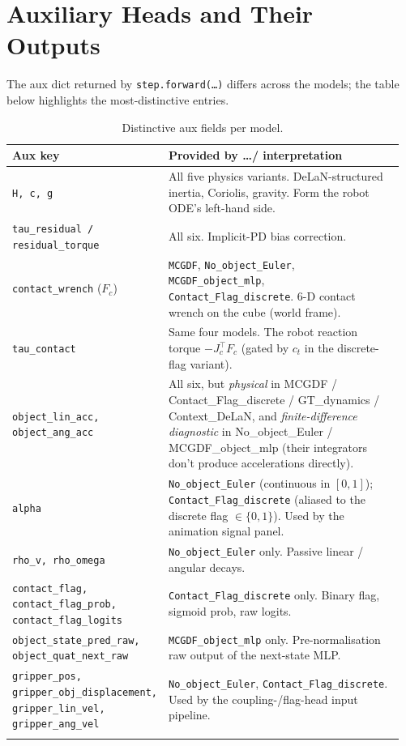 \documentclass[11pt]{article}
\begin{document}
\section{Auxiliary Heads and Their Outputs}

The aux dict returned by \texttt{step.forward(\dots)} differs across
the models; the table below highlights the most-distinctive entries.

\begin{longtable}{p{0.22\linewidth} p{0.74\linewidth}}
\toprule
Aux key & Provided by \dots / interpretation \\
\midrule
\texttt{H, c, g}                       & All five physics variants.  DeLaN-structured inertia, Coriolis, gravity.  Form the robot ODE's left-hand side. \\
\texttt{tau\_residual / residual\_torque} & All six.  Implicit-PD bias correction. \\
\texttt{contact\_wrench} ($F_c$)       & \texttt{MCGDF}, \texttt{No\_object\_Euler}, \texttt{MCGDF\_object\_mlp}, \texttt{Contact\_Flag\_discrete}.  6-D contact wrench on the cube (world frame). \\
\texttt{tau\_contact}                  & Same four models.  The robot reaction torque $-J_c^\top F_c$ (gated by $c_t$ in the discrete-flag variant). \\
\texttt{object\_lin\_acc, object\_ang\_acc} & All six, but \emph{physical} in MCGDF / Contact\_Flag\_discrete / GT\_dynamics / Context\_DeLaN, and \emph{finite-difference diagnostic} in No\_object\_Euler / MCGDF\_object\_mlp (their integrators don't produce accelerations directly). \\
\texttt{alpha}                          & \texttt{No\_object\_Euler} (continuous in $[0,1]$); \texttt{Contact\_Flag\_discrete} (aliased to the discrete flag $\in \{0,1\}$).  Used by the animation signal panel. \\
\texttt{rho\_v, rho\_omega}             & \texttt{No\_object\_Euler} only.  Passive linear / angular decays. \\
\texttt{contact\_flag, contact\_flag\_prob, contact\_flag\_logits} & \texttt{Contact\_Flag\_discrete} only.  Binary flag, sigmoid prob, raw logits. \\
\texttt{object\_state\_pred\_raw, object\_quat\_next\_raw} & \texttt{MCGDF\_object\_mlp} only.  Pre-normalisation raw output of the next-state MLP. \\
\texttt{gripper\_pos, gripper\_obj\_displacement, gripper\_lin\_vel, gripper\_ang\_vel} & \texttt{No\_object\_Euler}, \texttt{Contact\_Flag\_discrete}.  Used by the coupling-/flag-head input pipeline. \\
\bottomrule
\caption{Distinctive aux fields per model.}
\label{tab:cmp-aux}
\end{longtable}
\end{document}
